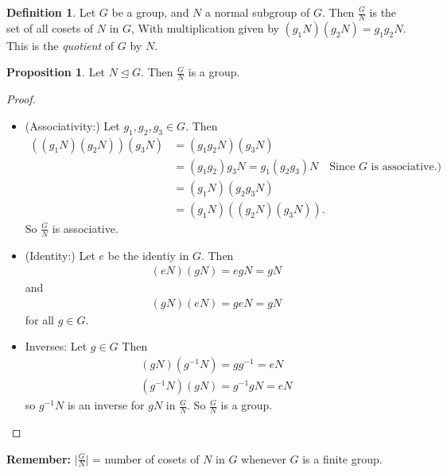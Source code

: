 \documentclass{article}
\theoremstyle{definition} \newtheorem*{definition}{Definition}
\newtheorem{proposition}[theorem]{Proposition}
\begin{document}
\begin{definition} Let $G$ be a group, and $N$ a normal subgroup of $G$. Then
  $\frac{G}{N}$ is the set of all cosets of $N$ in $G$, With multiplication
  given by $(g_1N)(g_2N)=g_1g_2N$. This is the \emph{quotient} of $G$ by $N$.\\
\end{definition}

\begin{proposition} Let $N \trianglelefteq G$. Then $\frac{G}{N}$ is a group.
\end{proposition}

\begin{proof}\hfill \begin{itemize} \item (Associativity:) Let $g_1,g_2,g_3 \in
          G$.  Then \begin{align*} ( (g_1N)(g_2N))(g_3N) &= (g_1g_2N)(g_3N) \\
            &= (g_1g_2)g_3N=g_1(g_2g_3)N \quad \text{Since } G \text{ is
            associative.)}\\ &= (g_1N)(g_2g_3N)\\ &=(g_1N)\left( (g_2N)(g_3N)
          \right).  \end{align*} So $\frac{G}{N}$ is associative.  \item
          (Identity:) Let $e$ be the identiy in $G$. Then \begin{align*}
            (eN)(gN)=egN=gN \end{align*} and \begin{align*} (gN)(eN)=geN=gN
          \end{align*} for all $g \in G$.

\item Inverses: Let $g \in G$ Then \begin{align*} (gN)(g^{-1}N) = gg^{-1} = eN
    \\ (g^{-1}N)(gN) = g^{-1}gN = eN \end{align*} so $g^{-1}N$ is an inverse
  for $gN$ in $\frac{G}{N}$.  So $\frac{G}{N}$ is a group.  \end{itemize}
  \end{proof}

\textbf{Remember:} $\big|\frac{G}{N}\big|$ = number of  cosets of $N$ in $G$
whenever $G$ is a finite group.\\
\end{document}
